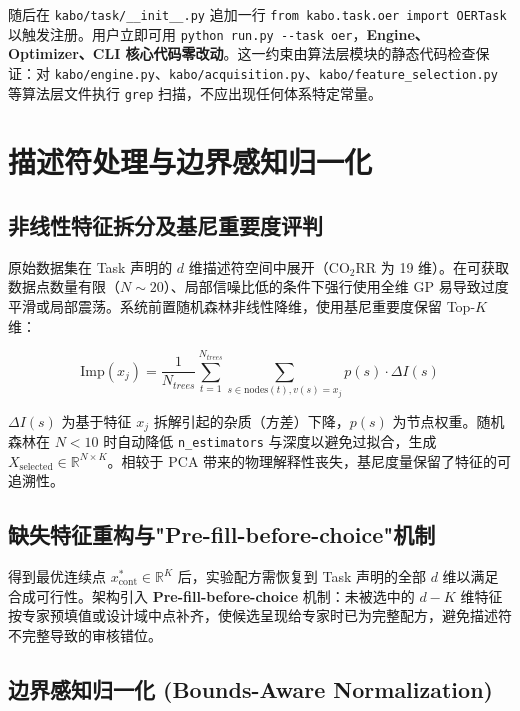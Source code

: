 \documentclass[12pt,a4paper]{article}
\newcommand{\brk}{\discretionary{}{}{}}
\begin{document}
随后在 \texttt{kabo/task/\_\_init\_\_.py} 追加一行 \texttt{from kabo.task.oer import OERTask} 以触发注册。用户立即可用 \texttt{python run.py -{}-task oer}，\textbf{Engine、Optimizer、CLI 核心代码零改动}。这一约束由算法层模块的静态代码检查保证：对 \texttt{kabo/engine.\brk py}、\texttt{kabo/acquisition.\brk py}、\texttt{kabo/feature\_\brk selection.py} 等算法层文件执行 \texttt{grep} 扫描，不应出现任何体系特定常量。


\section{描述符处理与边界感知归一化}

\subsection{非线性特征拆分及基尼重要度评判}

原始数据集在 Task 声明的 $d$ 维描述符空间中展开（CO$_2$RR 为 19 维）。在可获取数据点数量有限（$N \sim 20$）、局部信噪比低的条件下强行使用全维 GP 易导致过度平滑或局部震荡。系统前置随机森林非线性降维，使用基尼重要度保留 Top-$K$ 维：

\begin{equation}
    \text{Imp}(x_j) = \frac{1}{N_{trees}} \sum_{t=1}^{N_{trees}} \sum_{s \in \text{nodes}(t), v(s) = x_j} p(s) \cdot \Delta I(s)
\end{equation}

$\Delta I(s)$ 为基于特征 $x_j$ 拆解引起的杂质（方差）下降，$p(s)$ 为节点权重。随机森林在 $N < 10$ 时自动降低 \texttt{n\_estimators} 与深度以避免过拟合，生成 $X_{\text{selected}} \in \mathbb{R}^{N \times K}$。相较于 PCA 带来的物理解释性丧失，基尼度量保留了特征的可追溯性\cite{turbo2019}。

\subsection{缺失特征重构与"Pre-fill-before-choice"机制}

得到最优连续点 $x^*_{\text{cont}} \in \mathbb{R}^K$ 后，实验配方需恢复到 Task 声明的全部 $d$ 维以满足合成可行性。架构引入 \textbf{Pre-fill-before-choice} 机制：未被选中的 $d-K$ 维特征按专家预填值或设计域中点补齐，使候选呈现给专家时已为完整配方，避免描述符不完整导致的审核错位。

\subsection{边界感知归一化 (Bounds-Aware Normalization)}
\end{document}
